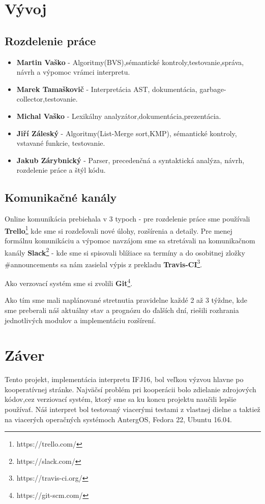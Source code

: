 \documentclass[12pt,a4paper]{report}
\begin{document}
\chapter{Vývoj}

\section{Rozdelenie práce}
\begin{itemize}
\item \textbf{Martin Vaško} - Algoritmy(BVS),sémantické kontroly,testovanie,správa, návrh a výpomoc vrámci interpretu.
\item \textbf{Marek Tamaškovič} - Interpretácia AST, dokumentácia, garbage-collector,testovanie.
\item \textbf{Michal Vaško} - Lexikálny analyzátor,dokumentácia,prezentácia.
\item \textbf{Jiří Záleský} - Algoritmy(List-Merge sort,KMP), sémantické kontroly, vstavané funkcie, testovanie.
\item \textbf{Jakub Zárybnický} - Parser, precedenčná a syntaktická analýza, návrh, rozdelenie práce a štýl kódu.
\end{itemize}

\section{Komunikačné kanály}
\par Online komunikácia prebiehala v 3 typoch - pre rozdelenie práce sme používali \textbf{Trello}\footnote{https://trello.com/} kde sme si rozdeľovali nové úlohy, rozšírenia a detaily. Pre menej formálnu komunikáciu a výpomoc navzájom sme sa stretávali na komunikačnom kanály \textbf{Slack}\footnote{https://slack.com/} - kde sme si spisovali blížiace sa termíny a do osobitnej zložky \#announcements sa nám zasielal výpis z prekladu \textbf{Travis-CI}\footnote{https://travis-ci.org/}.
\par Ako verzovací systém sme si zvolili \textbf{Git}\footnote{https://git-scm.com/}.
\par Ako tím sme mali naplánované stretnutia pravidelne každé 2 až 3 týždne, kde sme preberali náš aktuálny stav a prognózu do ďalších dní, riešili rozhrania jednotlivých modulov a implementáciu rozšírení.

\chapter{Záver}
Tento projekt, implementácia interpretu IFJ16, bol veľkou výzvou hlavne po kooperatívnej stránke. Najväčsí problém pri kooperácii bolo zdielanie zdrojových kódov,cez verziovací systém, ktorý sme sa ku koncu projektu naučili lepšie používať. Náš interpret bol testovaný viacerými testami z vlastnej dielne a taktiež na viacerých operačných systémoch AntergOS, Fedora 22, Ubuntu 16.04.
\end{document}
